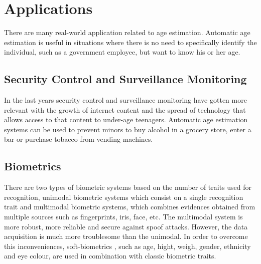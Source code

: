 \begin{table}[h!]
	\centering
	\caption{Age Estimation Methods}
	\label{tab:age-methods}
\end{table}

\section{Applications}
There are many real-world application related to age estimation. Automatic age estimation is useful in situations where there is no need to specifically identify the individual, such as a government employee, but want to know his or her age.

\subsection{Security Control and Surveillance Monitoring}
In the last years security control and surveillance monitoring have gotten more relevant with the growth of internet content and the spread of technology that allows access to that content to under-age teenagers. Automatic age estimation systems can be used to prevent minors to buy alcohol in a grocery store, enter a bar or purchase tobacco from vending machines.

\subsection{Biometrics}
There are two types of biometric systems based on the number of traits used for recognition, unimodal biometric systems which consist on a single recognition trait and multimodal biometric systems, which combines evidences obtained from multiple sources \cite{MSU-CSE-99-39} such as fingerprints, iris, face, etc. The multimodal system is more robust, more reliable and secure against spoof attacks. However, the data acquisition is much more troublesome than the unimodal. In order to overcome this inconveniences, soft-biometrics \cite{conf/icba/JainDN04}, such as age, hight, weigh, gender, ethnicity and eye colour, are used in combination with classic biometric traits. 

